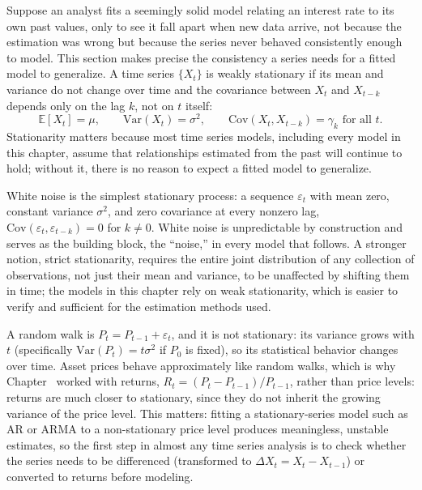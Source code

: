 \documentclass[../ai_in_finance]{subfiles}
\begin{document}
Suppose an analyst fits a seemingly solid model relating an interest rate to its own past values, only to see it fall apart when new data arrive, not because the estimation was wrong but because the series never behaved consistently enough to model. This section makes precise the consistency a series needs for a fitted model to generalize. A time series $\{X_t\}$ is weakly stationary if its mean and variance do not change over time and the covariance between $X_t$ and $X_{t-k}$ depends only on the lag $k$, not on $t$ itself:
\begin{equation}
\label{eq:timeseries-stationarity}
\mathbb{E}[X_t] = \mu, \qquad \text{Var}(X_t) = \sigma^2, \qquad \text{Cov}(X_t, X_{t-k}) = \gamma_k \text{ for all } t.
\end{equation}
Stationarity matters because most time series models, including every model in this chapter, assume that relationships estimated from the past will continue to hold; without it, there is no reason to expect a fitted model to generalize.

White noise is the simplest stationary process: a sequence $\varepsilon_t$ with mean zero, constant variance $\sigma^2$, and zero covariance at every nonzero lag, $\text{Cov}(\varepsilon_t, \varepsilon_{t-k}) = 0$ for $k \ne 0$. White noise is unpredictable by construction and serves as the building block, the ``noise,'' in every model that follows.
A stronger notion, strict stationarity, requires the entire joint distribution of any collection of observations, not just their mean and variance, to be unaffected by shifting them in time; the models in this chapter rely on weak stationarity, which is easier to verify and sufficient for the estimation methods used.

A random walk is $P_t = P_{t-1} + \varepsilon_t$, and it is not stationary: its variance grows with $t$ (specifically $\text{Var}(P_t) = t\sigma^2$ if $P_0$ is fixed), so its statistical behavior changes over time.
Asset prices behave approximately like random walks, which is why Chapter~ worked with returns, $R_t = (P_t - P_{t-1})/P_{t-1}$, rather than price levels: returns are much closer to stationary, since they do not inherit the growing variance of the price level. This matters: fitting a stationary-series model such as AR or ARMA to a non-stationary price level produces meaningless, unstable estimates, so the first step in almost any time series analysis is to check whether the series needs to be differenced (transformed to $\Delta X_t = X_t - X_{t-1}$) or converted to returns before modeling.
\end{document}
